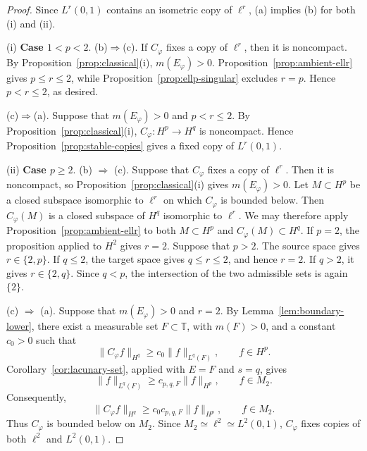 \documentclass[11pt, reqno]{amsart}
\theoremstyle{definition}
\theoremstyle{remark}
\newcommand{\T}{\mathbb{T}}
\begin{document}
\begin{proof}
Since \(L^r(0,1)\) contains an isometric copy of \(\ell^r\),
\textup{(a)} implies \textup{(b)} for both (i) and (ii).

{(i) \bf Case \(1<p<2\)}. \textup{(b)}\(\Rightarrow\)\textup{(c)}.  If \(C_\varphi\) fixes a copy of
\(\ell^r\), then it is noncompact. By
Proposition~\ref{prop:classical}\textup{(i)}, \(m(E_\varphi)>0\).
Proposition~\ref{prop:ambient-ellr} gives \(p\le r\le2\), while
Proposition~\ref{prop:ellp-singular} excludes \(r=p\). Hence
\(p<r\le2\), as desired.

\textup{(c)}\(\Rightarrow\)\textup{(a)}.  Suppose that \(m(E_\varphi)>0\) and \(p<r\le2\).
By Proposition~\ref{prop:classical}\textup{(i)},
\(C_\varphi:H^p\to H^q\) is noncompact. Hence
Proposition~\ref{prop:stable-copies} gives a
fixed copy of \(L^r(0,1)\). 





{(ii) \bf Case \(p\ge2\)}.  \textup{(b)} \(\Rightarrow\)  \textup{(c)}.  Suppose that \(C_\varphi\) fixes a copy of
\(\ell^r\). Then it is noncompact, so
Proposition~\ref{prop:classical}\textup{(i)} gives \(m(E_\varphi)>0\).
Let \(M\subset H^p\) be a closed subspace isomorphic to \(\ell^r\) on
which \(C_\varphi\) is bounded below. Then \(C_\varphi(M)\) is a closed
subspace of \(H^q\) isomorphic to \(\ell^r\). We may therefore apply
Proposition~\ref{prop:ambient-ellr} to both \(M\subset H^p\) and
\(C_\varphi(M)\subset H^q\).   If \(p=2\), the proposition applied to \(H^2\) gives \(r=2\).
Suppose that \(p>2\). The source space gives \(r\in\{2,p\}\).
If \(q\le2\), the target space gives \(q\le r\le2\), and hence
\(r=2\). If \(q>2\), it gives \(r\in\{2,q\}\). Since \(q<p\), the
intersection of the two admissible sets is again \(\{2\}\).  

 
\textup{(c)} \(\Rightarrow\) \textup{(a)}.  Suppose that \(m(E_\varphi)>0\) and \(r=2\).
By Lemma~\ref{lem:boundary-lower}, there exist a
measurable set \(F\subset\T\), with \(m(F)>0\), and a constant
\(c_0>0\) such that
\[
        \|C_\varphi f\|_{H^q}
        \ge
        c_0\|f\|_{L^q(F)},
        \qquad
        f\in H^p.
\]
Corollary~\ref{cor:lacunary-set}, applied with \(E=F\) and
\(s=q\), gives
\[
        \|f\|_{L^q(F)}
        \ge
        c_{p,q,F}\|f\|_{H^p},
        \qquad
        f\in M_2.
\]
Consequently,
\[
        \|C_\varphi f\|_{H^q}
        \ge
        c_0c_{p,q,F}\|f\|_{H^p},
        \qquad
        f\in M_2.
\]
Thus \(C_\varphi\) is bounded below on \(M_2\). Since
\(M_2\simeq\ell^2\simeq L^2(0,1)\), \(C_\varphi\) fixes copies of
both \(\ell^2\) and \(L^2(0,1)\). 
\end{proof}
\end{document}
